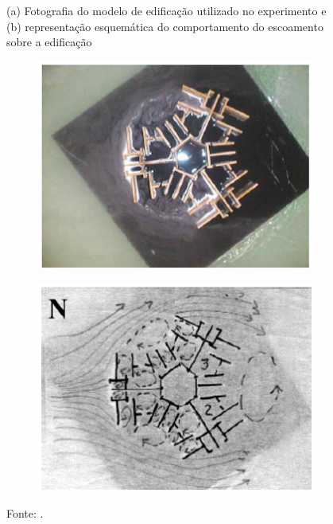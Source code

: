\documentclass[10pt, a4paper]{article}
\begin{document}
\begin{figure}[h]
	\centering
	\caption{(a) Fotografia do modelo de edificação utilizado no experimento e (b) representação esquemática do comportamento do escoamento sobre a edificação}
	\label{fig-exemplo}
	\begin{subfigure}[b]{0.45\textwidth}
		\centering
		\includegraphics[width=\textwidth]{fig-exemploA}
		\caption{}
		\label{fig-exemploA}
	\end{subfigure}
	\hfill
	\begin{subfigure}[b]{0.45\textwidth}
		\centering
		\includegraphics[width=\textwidth]{fig-exemploB}
		\caption{}
		\label{fig-exemploB}
	\end{subfigure}
	\caption*{Fonte: \cite{toledo-pereira:clacs2004}.}
\end{figure}
\end{document}
